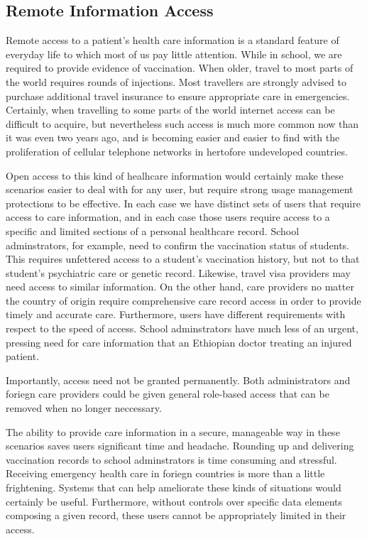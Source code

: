 \documentclass[10pt, conference, compsocconf]{IEEEtran}
\begin{document}
\subsection{Remote Information Access}
Remote access to a patient's health care information is a standard feature of everyday life to which most of us pay little attention.  While in school, we are required to provide evidence of vaccination.  When older, travel to most parts of the world requires rounds of injections.  Most travellers are strongly advised to purchase additional travel insurance to ensure appropriate care in emergencies.  Certainly, when travelling to some parts of the world internet access can be difficult to acquire, but nevertheless such access is much more common now than it was even two years ago, and is becoming easier and easier to find with the proliferation of cellular telephone networks in hertofore undeveloped countries.  

Open access to this kind of healhcare information would certainly make these scenarios easier to deal with for any user, but require strong usage management protections to be effective.  In each case we have distinct sets of users that require access to care information, and in each case those users require access to a specific and limited sections of a personal healthcare record.  School adminstrators, for example, need to confirm the vaccination status of students.  This requires unfettered access to a student's vaccination history, but not to that student's psychiatric care or genetic record.  Likewise, travel visa providers may need access to similar information.  On the other hand, care providers no matter the country of origin require comprehensive care record access in order to provide timely and accurate care.  Furthermore, users have different requirements with respect to the speed of access.  School adminstrators have much less of an urgent, pressing need for care information that an Ethiopian doctor treating an injured patient.  

Importantly, access need not be granted permanently.  Both administrators and foriegn care providers could be given general role-based access that can be removed when no longer neccessary.

The ability to provide care information in a secure, manageable way in these scenarios saves users significant time and headache.  Rounding up and delivering vaccination records to school adminstrators is time consuming and stressful.  Receiving emergency health care in foriegn countries is more than a little frightening.  Systems that can help ameliorate these kinds of situations would certainly be useful.  Furthermore, without controls over specific data elements composing a given record, these users cannot be appropriately limited in their access.
\end{document}
